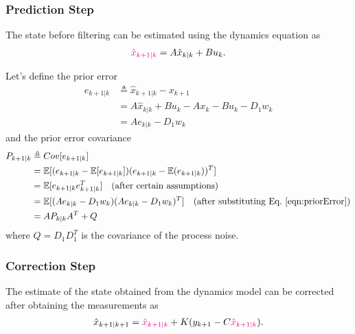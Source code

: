 \subsubsection{Prediction Step}
\hspace{\parindent}The state before filtering can be estimated using the dynamics equation as
\begin{align}
    \textcolor{magenta}{\hat{x}_{k+1|k}} = A \hat{x}_{k|k} + B u_k.
    \label{eqn:priorEstimate}
\end{align}

Let's define the prior error
\begin{align}
    e_{k+1|k} &\triangleq \hat{x}_{k+1|k} - x_{k+1} \\
    &= A \hat{x}_{k|k} + B u_k - A x_k - B u_k - D_1 w_k \\
    &= A e_{k|k} - D_1 w_k \label{eqn:priorError}
\end{align}
and the prior error covariance
\begin{align}
    P_{k+1|k} &\triangleq Cov[e_{k+1|k}] \\
    &= \mathbb{E}[(e_{k+1|k} - \mathbb{E}[e_{k+1|k}]) (e_{k+1|k} - \mathbb{E}(e_{k+1|k}))^T] \\
    &= \mathbb{E}[e_{k+1|k} e^{T}_{k+1|k}] \quad (\text{after certain assumptions}) \\
    &= \mathbb{E}[(A e_{k|k} - D_1 w_k) (A e_{k|k} - D_1 w_k)^T] \quad (\text{after substituting Eq.~\ref{eqn:priorError}}) \\
    &= A P_{k|k} A^T + Q \label{eqn:priorErrorCovariance}
\end{align}
where $Q = D_1 D_1^T$ is the covariance of the process noise.


\subsubsection{Correction Step}
\hspace{\parindent}The estimate of the state obtained from the dynamics model can be corrected after obtaining the measurements as
\begin{align}
    \hat{x}_{k+1|k+1} = \textcolor{magenta}{\hat{x}_{k+1|k}} + K (y_{k+1} - C \textcolor{magenta}{\hat{x}_{k+1|k}}).
    \label{eqn:posteriorEstimate}
\end{align}

